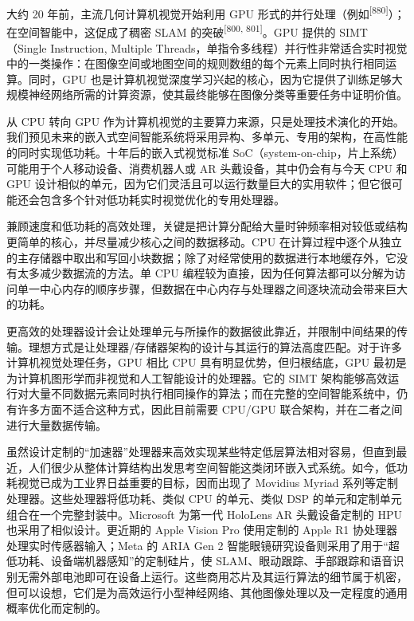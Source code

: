 大约 20 年前，主流几何计算机视觉开始利用 GPU 形式的并行处理（例如\textsuperscript{[880]}）；在空间智能中，这促成了稠密 SLAM 的突破\textsuperscript{[800, 801]}。GPU 提供的 SIMT（Single Instruction, Multiple Threads，单指令多线程）并行性非常适合实时视觉中的一类操作：在图像空间或地图空间的规则数组的每个元素上同时执行相同运算。同时，GPU 也是计算机视觉深度学习兴起的核心，因为它提供了训练足够大规模神经网络所需的计算资源，使其最终能够在图像分类等重要任务中证明价值。

从 CPU 转向 GPU 作为计算机视觉的主要算力来源，只是处理技术演化的开始。我们预见未来的嵌入式空间智能系统将采用异构、多单元、专用的架构，在高性能的同时实现低功耗。十年后的嵌入式视觉标准 SoC（system-on-chip，片上系统）可能用于个人移动设备、消费机器人或 AR 头戴设备，其中仍会有与今天 CPU 和 GPU 设计相似的单元，因为它们灵活且可以运行数量巨大的实用软件；但它很可能还会包含多个针对低功耗实时视觉优化的专用处理器。

兼顾速度和低功耗的高效处理，关键是把计算分配给大量时钟频率相对较低或结构更简单的核心，并尽量减少核心之间的数据移动。CPU 在计算过程中逐个从独立的主存储器中取出和写回小块数据；除了对经常使用的数据进行本地缓存外，它没有太多减少数据流的方法。单 CPU 编程较为直接，因为任何算法都可以分解为访问单一中心内存的顺序步骤，但数据在中心内存与处理器之间逐块流动会带来巨大的功耗。

更高效的处理器设计会让处理单元与所操作的数据彼此靠近，并限制中间结果的传输。理想方式是让处理器/存储器架构的设计与其运行的算法高度匹配。对于许多计算机视觉处理任务，GPU 相比 CPU 具有明显优势，但归根结底，GPU 最初是为计算机图形学而非视觉和人工智能设计的处理器。它的 SIMT 架构能够高效运行对大量不同数据元素同时执行相同操作的算法；而在完整的空间智能系统中，仍有许多方面不适合这种方式，因此目前需要 CPU/GPU 联合架构，并在二者之间进行大量数据传输。

虽然设计定制的“加速器”处理器来高效实现某些特定低层算法相对容易，但直到最近，人们很少从整体计算结构出发思考空间智能这类闭环嵌入式系统。如今，低功耗视觉已成为工业界日益重要的目标，因而出现了 Movidius Myriad 系列等定制处理器。这些处理器将低功耗、类似 CPU 的单元、类似 DSP 的单元和定制单元组合在一个完整封装中。Microsoft 为第一代 HoloLens AR 头戴设备定制的 HPU 也采用了相似设计。更近期的 Apple Vision Pro 使用定制的 Apple R1 协处理器处理实时传感器输入；Meta 的 ARIA Gen 2 智能眼镜研究设备则采用了用于“超低功耗、设备端机器感知”的定制硅片，使 SLAM、眼动跟踪、手部跟踪和语音识别无需外部电池即可在设备上运行。这些商用芯片及其运行算法的细节属于机密，但可以设想，它们是为高效运行小型神经网络、其他图像处理以及一定程度的通用概率优化而定制的。

